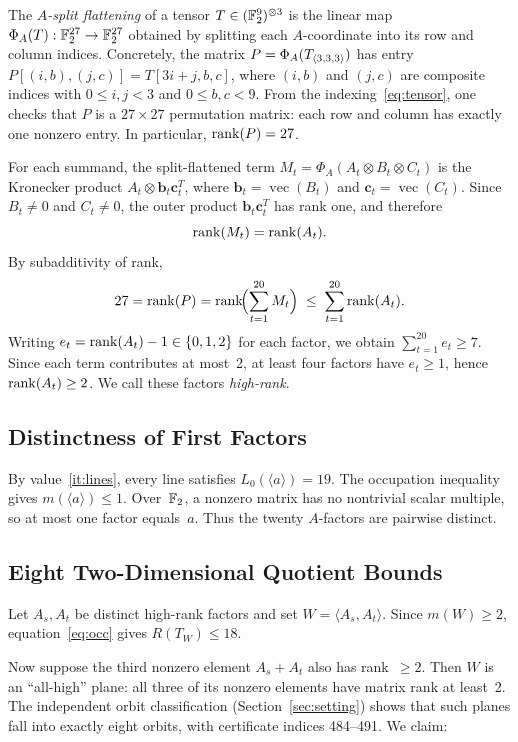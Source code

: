 \documentclass[11pt,a4paper]{article}
\begin{document}
The \emph{$A$-split flattening} of a tensor $T\in(\mathbb{F}_2^9)^{\otimes 3}$ is the linear map $\Phi_A(T):\mathbb{F}_2^{27}\to\mathbb{F}_2^{27}$ obtained by splitting each $A$-coordinate into its row and column indices.  Concretely, the matrix $P=\Phi_A(T_{\langle3,3,3\rangle})$ has entry $P[(i,b),(j,c)]=T[3i+j,b,c]$, where $(i,b)$ and $(j,c)$ are composite indices with $0\le i,j<3$ and $0\le b,c<9$.  From the indexing~\eqref{eq:tensor}, one checks that $P$ is a $27\times27$ permutation matrix: each row and column has exactly one nonzero entry.  In particular, $\operatorname{rank}(P)=27$.

For each summand, the split-flattened term $M_t=\Phi_A(A_t\otimes B_t\otimes C_t)$ is the Kronecker product $A_t\otimes\mathbf{b}_t\mathbf{c}_t^T$, where $\mathbf{b}_t=\operatorname{vec}(B_t)$ and $\mathbf{c}_t=\operatorname{vec}(C_t)$.  Since $B_t\ne 0$ and $C_t\ne 0$, the outer product $\mathbf{b}_t\mathbf{c}_t^T$ has rank one, and therefore
\[
  \operatorname{rank}(M_t) = \operatorname{rank}(A_t).
\]
By subadditivity of rank,
\begin{equation}\label{eq:rksum}
  27 = \operatorname{rank}(P) = \operatorname{rank}\!\Bigl(\sum_{t=1}^{20}M_t\Bigr) \;\le\; \sum_{t=1}^{20}\operatorname{rank}(A_t).
\end{equation}
Writing $e_t=\operatorname{rank}(A_t)-1\in\{0,1,2\}$ for each factor, we obtain $\sum_{t=1}^{20}e_t\ge 7$.  Since each term contributes at most~2, at least four factors have $e_t\ge 1$, hence $\operatorname{rank}(A_t)\ge 2$.  We call these factors \emph{high-rank}.

\subsection{Distinctness of First Factors}

By value~\ref{it:lines}, every line satisfies $L_0(\langle a\rangle)=19$. The occupation inequality gives $m(\langle a\rangle)\le1$. Over~$\mathbb{F}_2$, a nonzero matrix has no nontrivial scalar multiple, so at most one factor equals~$a$. Thus the twenty $A$-factors are pairwise distinct.

\subsection{Eight Two-Dimensional Quotient Bounds}\label{sec:dim2}

Let $A_s,A_t$ be distinct high-rank factors and set $W=\langle A_s,A_t\rangle$. Since $m(W)\ge2$, equation~\eqref{eq:occ} gives $R(T_W)\le18$.

Now suppose the third nonzero element $A_s+A_t$ also has rank~$\ge 2$.  Then $W$ is an ``all-high'' plane: all three of its nonzero elements have matrix rank at least~2.  The independent orbit classification (Section~\ref{sec:setting}) shows that such planes fall into exactly eight orbits, with certificate indices 484--491.  We claim:
\end{document}
